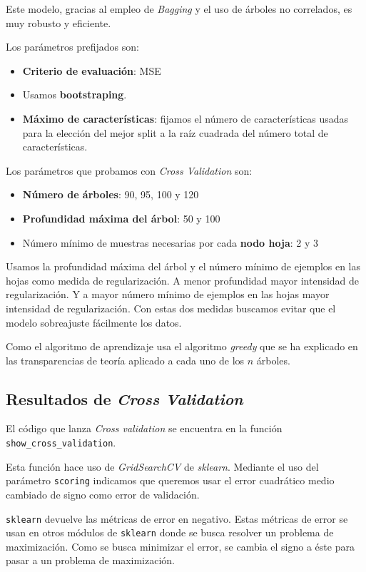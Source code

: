 \documentclass[11pt]{article}
\begin{document}
Este modelo, gracias al empleo de \emph{Bagging} y el uso de árboles no correlados, es muy robusto y eficiente.

Los parámetros prefijados son:

\begin{itemize}
  \item \textbf{Criterio de evaluación}: MSE
  \item Usamos \textbf{bootstraping}.
  \item \textbf{Máximo de características}: fijamos el número de características usadas para la elección del mejor split a la raíz cuadrada del número total de características.
\end{itemize}

Los parámetros que probamos con \emph{Cross Validation} son:

\begin{itemize}
  \item \textbf{Número de árboles}: 90, 95, 100 y 120
  \item \textbf{Profundidad máxima del árbol}: 50 y 100
  \item Número mínimo de muestras necesarias por cada \textbf{nodo hoja}: 2 y 3
\end{itemize}

Usamos la profundidad máxima del árbol y el número mínimo de ejemplos en las hojas como medida de regularización. A menor profundidad mayor intensidad de regularización. Y a mayor número mínimo de ejemplos en las hojas mayor intensidad de regularización. Con estas dos medidas buscamos evitar que el modelo sobreajuste fácilmente los datos.

Como el algoritmo de aprendizaje usa el algoritmo \emph{greedy} que se ha explicado en las transparencias de teoría aplicado a cada uno de los $n$ árboles.

\subsection{Resultados de \emph{Cross Validation}} \label{cross_validation}

El código que lanza \emph{Cross validation} se encuentra en la función \lstinline{show_cross_validation}.

Esta función hace uso de \emph{GridSearchCV} de \emph{sklearn}. Mediante el uso del parámetro \lstinline{scoring} indicamos que queremos usar el error cuadrático medio cambiado de signo como error de validación.

\lstinline{sklearn} devuelve las métricas de error en negativo. Estas métricas de error se usan en otros módulos de \lstinline{sklearn} donde se busca resolver un problema de maximización. Como se busca minimizar el error, se cambia el signo a éste para pasar a un problema de maximización.
\end{document}
